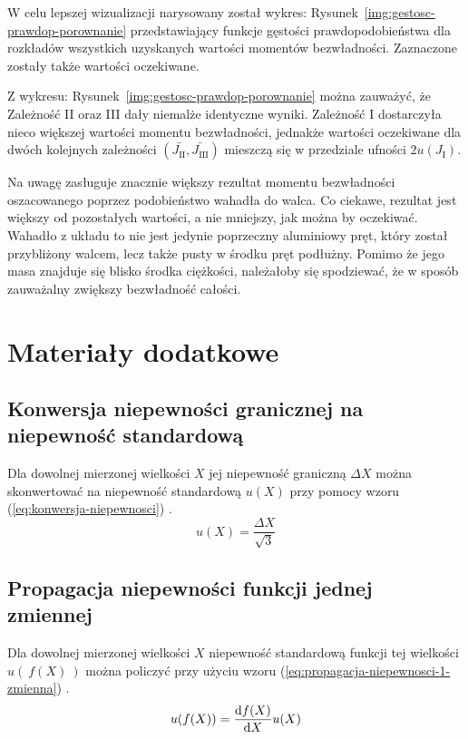 \documentclass[twocolumn, a4paper, polish, 10pt]{article}
\newcommand{\JXn}[1]{\ensuremath{ J_{\mathrm{#1}} }}
\begin{document}
W celu lepszej wizualizacji narysowany został wykres: Rysunek~\ref{img:gestosc-prawdop-porownanie} przedstawiający funkcje gęstości prawdopodobieństwa dla rozkładów wszystkich uzyskanych wartości  momentów bezwładności. Zaznaczone zostały także wartości oczekiwane.


Z wykresu: Rysunek~\ref{img:gestosc-prawdop-porownanie} można zauważyć, że Zależność II oraz III dały niemalże identyczne wyniki.
Zależność I dostarczyła nieco większej wartości momentu bezwładności, jednakże wartości oczekiwane dla dwóch kolejnych zależności $(\bar{\JXn{II}}, \bar{\JXn{III}})$ mieszczą się w przedziale ufności $2u(\JXn{I})$.

Na uwagę zasługuje znacznie większy rezultat momentu bezwładności oszacowanego poprzez podobieństwo wahadła do walca. Co ciekawe, rezultat jest większy od pozostałych wartości, a nie mniejszy, jak można by oczekiwać. Wahadło z układu to nie jest jedynie poprzeczny aluminiowy pręt, który został przybliżony walcem, lecz także pusty w środku pręt podłużny. Pomimo że jego masa znajduje się blisko środka ciężkości, należałoby się spodziewać, że w sposób zauważalny zwiększy bezwładność całości.

\section{Materiały dodatkowe}
\subsection{Konwersja niepewności granicznej na niepewność standardową}
Dla dowolnej mierzonej wielkości $X$ jej niepewność graniczną $\Delta X$ można skonwertować na niepewność standardową $u(X)$ przy pomocy wzoru (\ref{eq:konwersja-niepewnosci}) \cite{smop-wyklad}.
\begin{equation}
    u(X) = \frac{ \Delta X }{ \sqrt{3} }
    \label{eq:konwersja-niepewnosci}
\end{equation}

\subsection{Propagacja niepewności funkcji jednej zmiennej}
Dla dowolnej mierzonej wielkości $X$ niepewność standardową funkcji tej wielkości $u(~f(X)~)$ można policzyć przy użyciu wzoru (\ref{eq:propagacja-niepewnosci-1-zmienna}) \cite{smop-wyklad}.
\begin{equation}
    u( f(X) ) = \dv{f(X)}{X} u(X)
    \label{eq:propagacja-niepewnosci-1-zmienna}
\end{equation}
\end{document}
